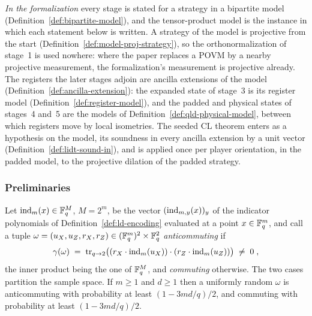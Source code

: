 \begin{remark}
\emph{In the formalization} every stage is stated for a strategy in a bipartite model
(Definition~\ref{def:bipartite-model}), and the tensor-product model is the instance in which each
statement below is written. A strategy of the model is projective from the start
(Definition~\ref{def:model-proj-strategy}), so the orthonormalization of stage~1 is used nowhere:
where the paper replaces a POVM by a nearby projective measurement, the formalization's measurement
is projective already. The registers the later stages adjoin are ancilla extensions of the model
(Definition~\ref{def:ancilla-extension}): the expanded state of stage~3 is its register model
(Definition~\ref{def:register-model}), and the padded and physical states of stages~4 and~5 are
the models of Definition~\ref{def:qld-physical-model}, between which registers move by local
isometries. The seeded CL theorem enters as a hypothesis on the model, its soundness in every
ancilla extension by a unit vector (Definition~\ref{def:lidt-sound-in}), and is applied once per
player orientation, in the padded model, to the projective dilation of the padded strategy.
\end{remark}

\subsubsection{Preliminaries}

\effortMedium

\begin{lemma}
\label{fact:omega-anticomm-prob}
\leanok
Let $\mathrm{ind}_m(x) \in \mathbb{F}_q^M$, $M = 2^m$, be the vector $(\mathrm{ind}_{m,y}(x))_y$ of the indicator
polynomials of Definition~\ref{def:ld-encoding} evaluated at a point $x \in \mathbb{F}_q^m$, and call
a tuple $\omega = (u_X, u_Z, r_X, r_Z) \in (\mathbb{F}_q^m)^2 \times \mathbb{F}_q^2$ \emph{anticommuting} if
\begin{equation*}
  \gamma(\omega) \;=\; \operatorname{tr}_{q \to 2}\bigl( (r_X \cdot \mathrm{ind}_m(u_X)) \cdot
    (r_Z \cdot \mathrm{ind}_m(u_Z)) \bigr) \;\neq\; 0\;,
\end{equation*}
the inner product being the one of $\mathbb{F}_q^M$, and \emph{commuting} otherwise. The two cases
partition the sample space. If $m \geq 1$ and $d \geq 1$ then a uniformly random $\omega$ is
anticommuting with probability at least $(1 - 3md/q)/2$, and commuting with probability at
least $(1 - 3md/q)/2$.
\end{lemma}

